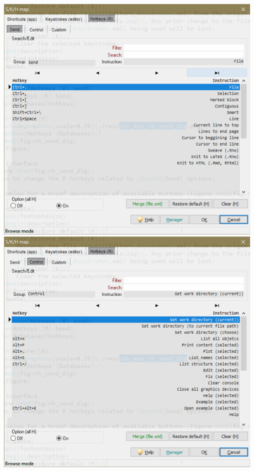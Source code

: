 \includegraphics[scale=.4]{./res/dlg_skh_map_rh_send.png}
\includegraphics[scale=.4]{./res/dlg_skh_map_rh_control.png}
